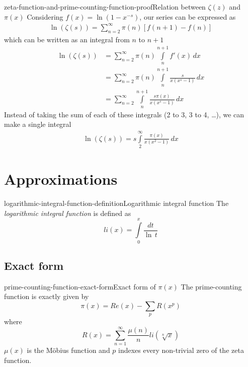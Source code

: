 \documentclass[preview]{standalone}
\begin{document}
\begin{snippetproof}{zeta-function-and-prime-counting-function-proof}{Relation between \(\zeta(z)\) and \(\pi(x)\)}
    Considering \(f(x)=\ln(1-x^{-s})\), our series can be expressed as
    \begin{align*}
        \ln\left(\zeta(s)\right)=
        \sum_{n=2}^{\infty}\pi(n)\left[f(n+1)-f(n)\right]
    \end{align*}
    which can be written as an integral from \(n\) to \(n+1\)
    \begin{align*}
        \ln\left(\zeta(s)\right)&=
        \sum_{n=2}^{\infty}\pi(n)
        \int\limits_n^{n+1} f'(x)\,dx
        \\
        &=
        \sum_{n=2}^{\infty}\pi(n)
        \int\limits_n^{n+1}
        \frac{s}{x(x^s-1)}\,dx
        \\
        &=
        \sum_{n=2}^{\infty}
        \int\limits_n^{n+1}
        \frac{s\pi(x)}{x(x^s-1)}\,dx
    \end{align*}
    Instead of taking the sum of each of these integrals (2 to 3, 3 to 4, \ldots), we can make a single integral
    \begin{align*}
        \ln\left(\zeta(s)\right)=
        s\int\limits_2^\infty
        \frac{\pi(x)}{x(x^2-1)}\,dx
    \end{align*}
\end{snippetproof}

\section{Approximations}


\begin{snippetdefinition}{logarithmic-integral-function-definition}{Logarithmic integral function}
    The \textit{logarithmic integral function} is defined as
    \[
        li(x)=\int\limits_0^{x} \frac{dt}{\ln\,t}
    \]
\end{snippetdefinition}


\subsection{Exact form}

\begin{snippettheorem}{prime-counting-function-exact-form}{Exact form of \(\pi(x)\)}
    The prime-counting function is exactly given by
    \[
        \pi(x)=Re(x)-\sum_{p}R(x^p)
    \]
    where
    \[
        R(x)=\sum_{n=1}^{\infty}\frac{\mu(n)}{n}li(\sqrt[n]{x})
    \]
    \(\mu(x)\) is the Möbius function and
    \(p\) indexes every non-trivial zero of the zeta function.
\end{snippettheorem}
\end{document}
